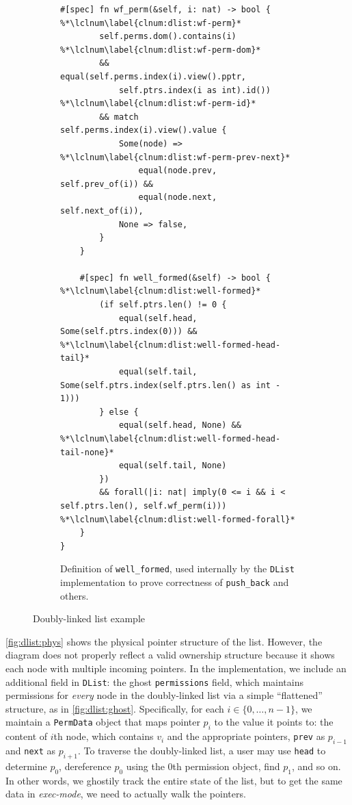 \begin{figure}
\begin{subfigure}{.48\textwidth}
\begin{lstlisting}[language=Verus,style=VerusLineNos]
    #[spec] fn wf_perm(&self, i: nat) -> bool { %*\lclnum\label{clnum:dlist:wf-perm}*
        self.perms.dom().contains(i) %*\lclnum\label{clnum:dlist:wf-perm-dom}*
        && equal(self.perms.index(i).view().pptr,
            self.ptrs.index(i as int).id()) %*\lclnum\label{clnum:dlist:wf-perm-id}*
        && match self.perms.index(i).view().value {
            Some(node) => %*\lclnum\label{clnum:dlist:wf-perm-prev-next}*
                equal(node.prev, self.prev_of(i)) &&
                equal(node.next, self.next_of(i)),
            None => false,
        }
    }

    #[spec] fn well_formed(&self) -> bool { %*\lclnum\label{clnum:dlist:well-formed}*
        (if self.ptrs.len() != 0 {
            equal(self.head, Some(self.ptrs.index(0))) && %*\lclnum\label{clnum:dlist:well-formed-head-tail}*
            equal(self.tail, Some(self.ptrs.index(self.ptrs.len() as int - 1)))
        } else {
            equal(self.head, None) && %*\lclnum\label{clnum:dlist:well-formed-head-tail-none}*
            equal(self.tail, None)
        })
        && forall(|i: nat| imply(0 <= i && i < self.ptrs.len(), self.wf_perm(i))) %*\lclnum\label{clnum:dlist:well-formed-forall}*
    }
}
\end{lstlisting}
\caption{Definition of \texttt{well\_formed}, used internally by the \texttt{DList}
         implementation to prove correctness of \texttt{push\_back} and others.} \label{fig:dlist:code:wf}
\end{subfigure}
    \caption{Doubly-linked list example} \label{fig:dlist:code}
\end{figure}

\autoref{fig:dlist:phys} shows the physical pointer structure of the list.
However, the diagram does not properly reflect a valid ownership structure
because it shows each node with multiple incoming pointers.
%
In the \verus implementation, we include an additional field in \verb`DList`:
the ghost \verb`permissions` field, which maintains permissions for \emph{every} node
in the doubly-linked list via a simple ``flattened'' structure, as in \autoref{fig:dlist:ghost}.
Specifically, for each $i \in \{0,\ldots,n-1\}$, we maintain a \verb`PermData` object
that maps pointer $p_i$ to the value it points to: the content of $i$th node, which contains
$v_i$ and the appropriate pointers, \verb`prev` as $p_{i-1}$ and \verb`next` as $p_{i+1}$.
To traverse the doubly-linked list, a user may use \verb`head` to determine $p_0$,
dereference $p_0$ using the $0$th permission object, find $p_1$, and so on.
In other words, we ghostily track the entire state of the list, but to get the same data in \emph{exec-mode}, we need to actually walk the pointers.

